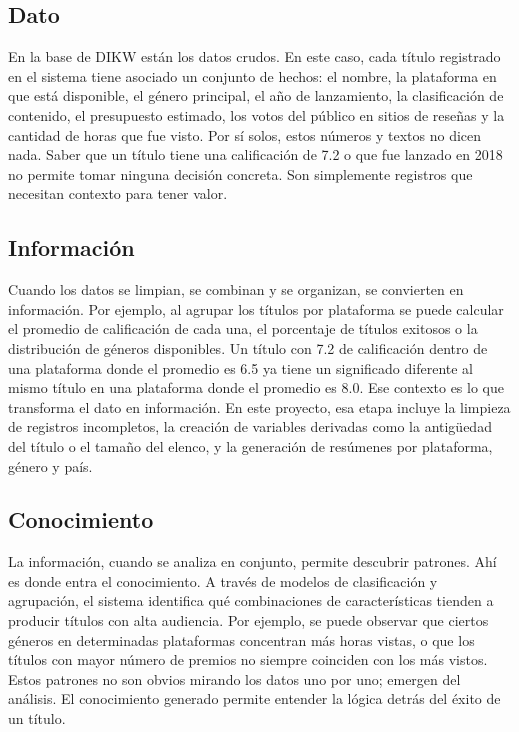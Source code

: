 \documentclass[12pt,a4paper]{article}
\begin{document}
\subsection*{Dato}

En la base de DIKW est\'an los datos crudos. En este caso, cada t\'itulo registrado en el sistema tiene asociado un conjunto de hechos: el nombre, la plataforma en que est\'a disponible, el g\'enero principal, el a\~no de lanzamiento, la clasificaci\'on de contenido, el presupuesto estimado, los votos del p\'ublico en sitios de rese\~nas y la cantidad de horas que fue visto. Por s\'i solos, estos n\'umeros y textos no dicen nada. Saber que un t\'itulo tiene una calificaci\'on de 7.2 o que fue lanzado en 2018 no permite tomar ninguna decisi\'on concreta. Son simplemente registros que necesitan contexto para tener valor.

\subsection*{Informaci\'on}

Cuando los datos se limpian, se combinan y se organizan, se convierten en informaci\'on. Por ejemplo, al agrupar los t\'itulos por plataforma se puede calcular el promedio de calificaci\'on de cada una, el porcentaje de t\'itulos exitosos o la distribuci\'on de g\'eneros disponibles. Un t\'itulo con 7.2 de calificaci\'on dentro de una plataforma donde el promedio es 6.5 ya tiene un significado diferente al mismo t\'itulo en una plataforma donde el promedio es 8.0. Ese contexto es lo que transforma el dato en informaci\'on. En este proyecto, esa etapa incluye la limpieza de registros incompletos, la creaci\'on de variables derivadas como la antig\"uedad del t\'itulo o el tama\~no del elenco, y la generaci\'on de res\'umenes por plataforma, g\'enero y pa\'is.

\subsection*{Conocimiento}

La informaci\'on, cuando se analiza en conjunto, permite descubrir patrones. Ah\'i es donde entra el conocimiento. A trav\'es de modelos de clasificaci\'on y agrupaci\'on, el sistema identifica qu\'e combinaciones de caracter\'isticas tienden a producir t\'itulos con alta audiencia. Por ejemplo, se puede observar que ciertos g\'eneros en determinadas plataformas concentran m\'as horas vistas, o que los t\'itulos con mayor n\'umero de premios no siempre coinciden con los m\'as vistos. Estos patrones no son obvios mirando los datos uno por uno; emergen del an\'alisis. El conocimiento generado permite entender la l\'ogica detr\'as del \'exito de un t\'itulo.
\end{document}
